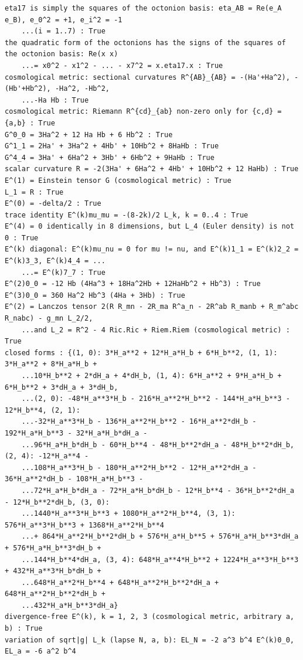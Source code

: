 \documentclass[10pt,a4paper]{article}
\begin{document}
\begin{Verbatim}[fontsize=\small,frame=single,framesep=2mm]
eta17 is simply the squares of the octonion basis: eta_AB = Re(e_A e_B), e_0^2 = +1, e_i^2 = -1
    ...(i = 1..7) : True
the quadratic form of the octonions has the signs of the squares of the octonion basis: Re(x x)
    ...= x0^2 - x1^2 - ... - x7^2 = x.eta17.x : True
cosmological metric: sectional curvatures R^{AB}_{AB} = -(Ha'+Ha^2), -(Hb'+Hb^2), -Ha^2, -Hb^2,
    ...-Ha Hb : True
cosmological metric: Riemann R^{cd}_{ab} non-zero only for {c,d} = {a,b} : True
G^0_0 = 3Ha^2 + 12 Ha Hb + 6 Hb^2 : True
G^1_1 = 2Ha' + 3Ha^2 + 4Hb' + 10Hb^2 + 8HaHb : True
G^4_4 = 3Ha' + 6Ha^2 + 3Hb' + 6Hb^2 + 9HaHb : True
scalar curvature R = -2(3Ha' + 6Ha^2 + 4Hb' + 10Hb^2 + 12 HaHb) : True
E^(1) = Einstein tensor G (cosmological metric) : True
L_1 = R : True
E^(0) = -delta/2 : True
trace identity E^(k)mu_mu = -(8-2k)/2 L_k, k = 0..4 : True
E^(4) = 0 identically in 8 dimensions, but L_4 (Euler density) is not 0 : True
E^(k) diagonal: E^(k)mu_nu = 0 for mu != nu, and E^(k)1_1 = E^(k)2_2 = E^(k)3_3, E^(k)4_4 = ...
    ...= E^(k)7_7 : True
E^(2)0_0 = -12 Hb (4Ha^3 + 18Ha^2Hb + 12HaHb^2 + Hb^3) : True
E^(3)0_0 = 360 Ha^2 Hb^3 (4Ha + 3Hb) : True
E^(2) = Lanczos tensor 2(R R_mn - 2R_ma R^a_n - 2R^ab R_manb + R_m^abc R_nabc) - g_mn L_2/2,
    ...and L_2 = R^2 - 4 Ric.Ric + Riem.Riem (cosmological metric) : True
closed forms : {(1, 0): 3*H_a**2 + 12*H_a*H_b + 6*H_b**2, (1, 1): 3*H_a**2 + 8*H_a*H_b +
    ...10*H_b**2 + 2*dH_a + 4*dH_b, (1, 4): 6*H_a**2 + 9*H_a*H_b + 6*H_b**2 + 3*dH_a + 3*dH_b,
    ...(2, 0): -48*H_a**3*H_b - 216*H_a**2*H_b**2 - 144*H_a*H_b**3 - 12*H_b**4, (2, 1):
    ...-32*H_a**3*H_b - 136*H_a**2*H_b**2 - 16*H_a**2*dH_b - 192*H_a*H_b**3 - 32*H_a*H_b*dH_a -
    ...96*H_a*H_b*dH_b - 60*H_b**4 - 48*H_b**2*dH_a - 48*H_b**2*dH_b, (2, 4): -12*H_a**4 -
    ...108*H_a**3*H_b - 180*H_a**2*H_b**2 - 12*H_a**2*dH_a - 36*H_a**2*dH_b - 108*H_a*H_b**3 -
    ...72*H_a*H_b*dH_a - 72*H_a*H_b*dH_b - 12*H_b**4 - 36*H_b**2*dH_a - 12*H_b**2*dH_b, (3, 0):
    ...1440*H_a**3*H_b**3 + 1080*H_a**2*H_b**4, (3, 1): 576*H_a**3*H_b**3 + 1368*H_a**2*H_b**4
    ...+ 864*H_a**2*H_b**2*dH_b + 576*H_a*H_b**5 + 576*H_a*H_b**3*dH_a + 576*H_a*H_b**3*dH_b +
    ...144*H_b**4*dH_a, (3, 4): 648*H_a**4*H_b**2 + 1224*H_a**3*H_b**3 + 432*H_a**3*H_b*dH_b +
    ...648*H_a**2*H_b**4 + 648*H_a**2*H_b**2*dH_a + 648*H_a**2*H_b**2*dH_b +
    ...432*H_a*H_b**3*dH_a}
divergence-free E^(k), k = 1, 2, 3 (cosmological metric, arbitrary a, b) : True
variation of sqrt|g| L_k (lapse N, a, b): EL_N = -2 a^3 b^4 E^(k)0_0, EL_a = -6 a^2 b^4

\end{Verbatim}
\end{document}
